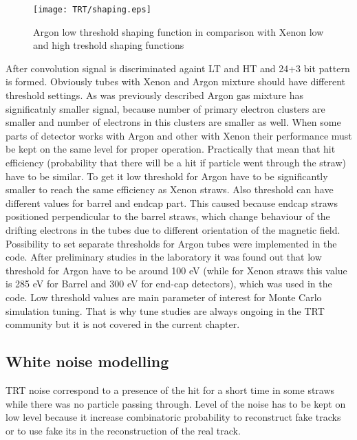 \begin{figure}
\begin{center}
 \texttt{[image: TRT/shaping.eps]}
\caption{Argon low threshold shaping function in comparison with Xenon low and high treshold shaping functions}
\label{fig:shaping}
\end{center}
\end{figure}


After convolution signal is discriminated againt LT and HT and 24+3 bit pattern is formed.
Obviously tubes with Xenon and Argon mixture should have different threshold settings.
As was previously described Argon gas mixture has significatnly smaller signal, because
number of primary electron clusters are smaller and number of electrons in this clusters are smaller as well.
When some parts of detector works with Argon and other with Xenon their performance must be kept on the same level for
proper operation. Practically that mean that hit efficiency (probability that there will be a hit if particle went through the straw) have to be 
similar. To get it low threshold for Argon have to be significantly smaller to reach the same efficiency as Xenon straws.
Also threshold can have different values for barrel and endcap part. This caused because endcap straws positioned perpendicular to the barrel straws, 
which change behaviour of the drifting electrons in the tubes due to different orientation of the magnetic field.
Possibility to set separate thresholds for Argon tubes were implemented in the code.
After preliminary studies in the laboratory it was found out that low threshold for Argon have to be around 100 eV 
(while for Xenon straws this value is 285 eV for Barrel and 300 eV for end-cap detectors), which was used in the code.
Low threshold values are main parameter of interest for Monte Carlo simulation tuning. That is why tune studies are always ongoing 
in the TRT community but it is not covered in the current chapter.

\subsection{White noise modelling}

TRT noise correspond to a presence of the hit for a short time in some straws while there was no particle passing through.
Level of the noise has to be kept on low level because it increase combinatoric probability to reconstruct fake tracks or to use 
fake its in the reconstruction of the real track.


